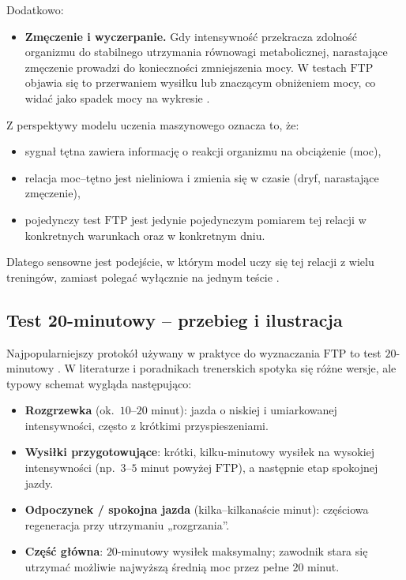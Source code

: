 Dodatkowo:
\begin{itemize}
  \item \textbf{Zmęczenie i wyczerpanie.} Gdy intensywność przekracza zdolność organizmu do stabilnego utrzymania równowagi metabolicznej, narastające zmęczenie prowadzi do konieczności zmniejszenia mocy. W testach $\mathrm{FTP}$ objawia się to przerwaniem wysiłku lub znaczącym obniżeniem mocy, co widać jako spadek mocy na wykresie \cite{borszcz2018ftp,karsten2021cpftp}.
\end{itemize}

Z perspektywy modelu uczenia maszynowego oznacza to, że:
\begin{itemize}
  \item sygnał tętna zawiera informację o reakcji organizmu na obciążenie (moc),
  \item relacja moc--tętno jest nieliniowa i zmienia się w czasie (dryf, narastające zmęczenie),
  \item pojedynczy test $\mathrm{FTP}$ jest jedynie pojedynczym pomiarem tej relacji w konkretnych warunkach oraz w konkretnym dniu.
\end{itemize}

Dlatego sensowne jest podejście, w którym model uczy się tej relacji z wielu treningów, zamiast polegać wyłącznie na jednym teście \cite{stockwell2023mlftp,denham2020predictftp}.

\subsection{Test 20-minutowy -- przebieg i ilustracja}

Najpopularniejszy protokół używany w praktyce do wyznaczania $\mathrm{FTP}$ to test $20$-minutowy \cite{allen2019power,sitko2023_ac20to60_update,phasescycling2023_ftp_variability}.
W literaturze i poradnikach trenerskich spotyka się różne wersje, ale typowy schemat wygląda następująco:
\begin{itemize}
  \item \textbf{Rozgrzewka} (ok.\ $10$--$20$ minut): jazda o niskiej i umiarkowanej intensywności, często z krótkimi przyspieszeniami.
  \item \textbf{Wysiłki przygotowujące}: krótki, kilku-minutowy wysiłek na wysokiej intensywności (np.\ $3$--$5$ minut powyżej $\mathrm{FTP}$), a następnie etap spokojnej jazdy.
  \item \textbf{Odpoczynek / spokojna jazda} (kilka--kilkanaście minut): częściowa regeneracja przy utrzymaniu „rozgrzania”.
  \item \textbf{Część główna}: $20$-minutowy wysiłek maksymalny; zawodnik stara się utrzymać możliwie najwyższą średnią moc przez pełne $20$ minut.
\end{itemize}

